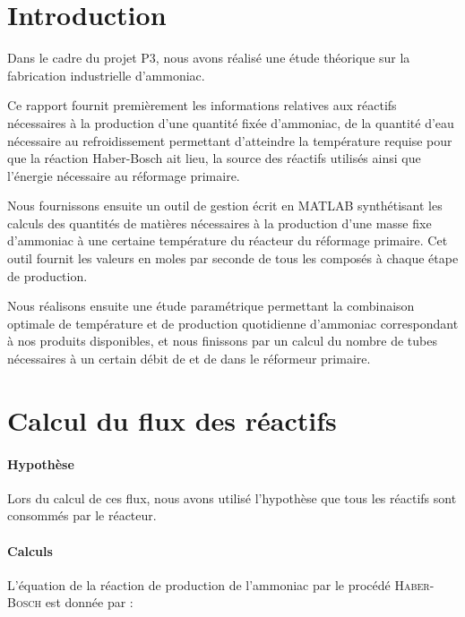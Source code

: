 
\usepackage[numbered, framed]{mcode}

\section{Introduction}
Dans le cadre du projet P3, nous avons réalisé une 
étude théorique sur la fabrication
industrielle d'ammoniac.

Ce rapport fournit premièrement les informations relatives
aux réactifs nécessaires à la production d'une quantité fixée 
d'ammoniac, de la quantité d'eau nécessaire au refroidissement
permettant d'atteindre la température requise pour que la 
réaction Haber-Bosch ait lieu, la source des réactifs utilisés
ainsi que l'énergie nécessaire au réformage 
primaire.

Nous fournissons ensuite un outil de gestion écrit en MATLAB 
synthétisant les calculs des quantités de matières nécessaires 
à la production d'une masse fixe d'ammoniac à une certaine 
température du réacteur du réformage primaire. Cet outil fournit 
les valeurs en moles par seconde de tous les composés à chaque étape de production.

Nous réalisons ensuite une étude paramétrique permettant la combinaison
optimale de température et de production quotidienne 
d'ammoniac correspondant à nos produits disponibles, et nous finissons
par un calcul du nombre de tubes nécessaires à un 
certain débit de  et de  dans le réformeur primaire.
\section{Calcul du flux des réactifs}
\paragraph{Hypothèse}
Lors du calcul de ces flux, nous avons utilisé l'hypothèse que 
tous les réactifs sont 
consommés par le réacteur.

\paragraph{Calculs}
L'équation de la réaction de production de l'ammoniac par le
procédé \textsc{Haber-Bosch} est donnée par :

